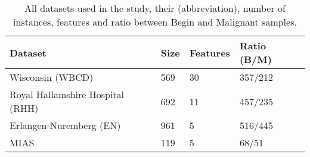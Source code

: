 \medskip
\begin{table}[ht!]
\begin{center}
   \begin{tabular}{l*{3}{l}}
   \hline
   Dataset         &
   Size  &
   Features  &
   Ratio (B/M)     \\
   \hline
   Wisconsin (WBCD)						 &
   569                         &
   30                          &
   357/212                     \\
   Royal Hallamshire Hospital (RHH)  &
   692                         &
   11                          &
   457/235                     \\
   Erlangen-Nuremberg (EN)     &
   961                         &
   5                           &
   516/445                     \\
   MIAS         							 &
   119                         &
   5                           &
   68/51                     	 \\
  \hline
  \end{tabular}
  \caption[]
  {\small All datasets used in the study, their (abbreviation), number of instances, features and ratio between Begin and Malignant samples. }
  \label{table:datasets_info}
\end{center}
\end{table}

